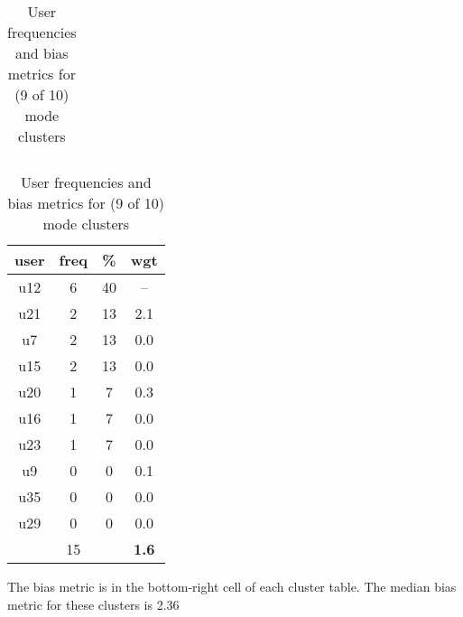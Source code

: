\begin{appendices}
\begin{table}
\begin{tabular}{ |c|c|c|c| }
	\hline
\end{tabular}
\begin{tabular}{ |c|c|c|c| }
	\hline
	\textbf{user} & \textbf{freq} & \textbf{\%} & \textbf{wgt} \\
	\hline
	u12 & 6 & 40 & -- \\
	u21 & 2 & 13 & 2.1 \\
	u7 & 2 & 13 & 0.0 \\
	u15 & 2 & 13 & 0.0 \\
	u20 & 1 & 7 & 0.3 \\
	u16 & 1 & 7 & 0.0 \\
	u23 & 1 & 7 & 0.0 \\
	u9 & 0 & 0 & 0.1 \\
	u35 & 0 & 0 & 0.0 \\
	u29 & 0 & 0 & 0.0 \\
	 & 15 & & \textbf{1.6} \\
	\hline
\end{tabular}
\caption{User frequencies and bias metrics for (9 of 10) mode clusters}
{\small The bias metric is in the bottom-right cell of each cluster table. The median bias metric for these clusters is 2.36}
\end{table}


\end{appendices}
